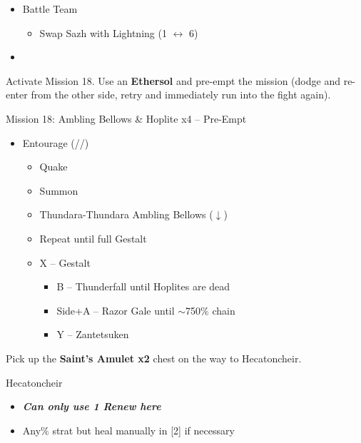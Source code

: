 \begin{menu}
	\begin{itemize}
		\paradigm
		\begin{itemize}
			\item Battle Team
				\begin{itemize}
					\item Swap Sazh with Lightning (1 $\leftrightarrow$ 6)
				\end{itemize}
			\item {}%
				  {\paradigmline[4]{(\rav)}{\med}{\sen}}%
			      {\paradigmline{\rav}{\rav}{\com}}%
			      {\paradigmline{\med}{\med}{\sen}}%
		\end{itemize}
	\end{itemize}
\end{menu}

\renewcommand{\first}{[1] Entourage (\rav/\med/\sen)}

Activate Mission 18.
Use an \textbf{Ethersol} and pre-empt the mission (dodge and re-enter from the other side, retry and immediately run into the fight again).

\begin{battle}{Mission 18: Ambling Bellows \& Hoplite x4 -- Pre-Empt}
	\begin{itemize}
		\item \first
			\begin{itemize}
				\item Quake
				\item Summon
				\item Thundara-Thundara Ambling Bellows ($\downarrow$)
				\item Repeat until full Gestalt
				\item X -- Gestalt
					\begin{itemize}
						\item B -- Thunderfall until Hoplites are dead
						\item Side+A -- Razor Gale until $\sim$750\% chain
						\item Y -- Zantetsuken
					\end{itemize}
			\end{itemize}
	\end{itemize}
\end{battle}

Pick up the \textbf{Saint's Amulet x2} chest on the way to Hecatoncheir.

\begin{battle}{Hecatoncheir}
	\begin{itemize}
		\item \textit{\textbf{Can only use 1 Renew here}}
		\item Any\% strat but heal manually in [2] if necessary
	\end{itemize}
\end{battle}


